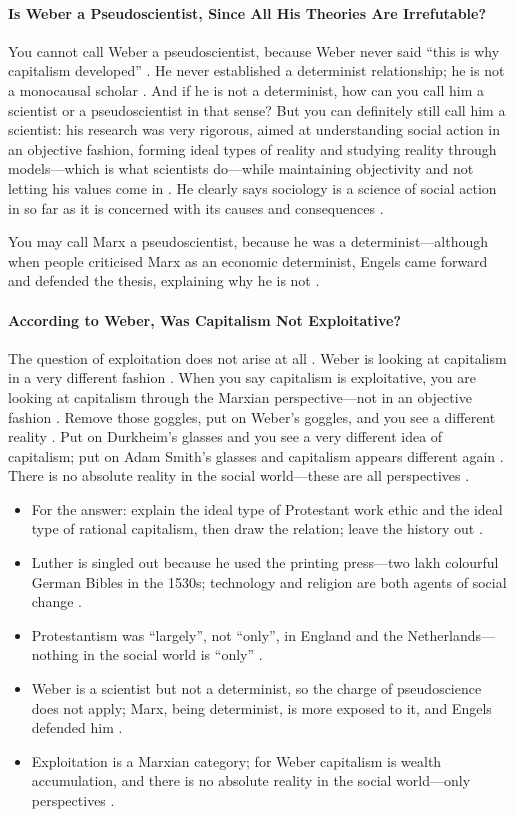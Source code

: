 \paragraph{Is Weber a Pseudoscientist, Since All His Theories Are Irrefutable?}
You cannot call Weber a pseudoscientist, because Weber never said ``this is why capitalism developed'' . He never established a determinist relationship; he is not a monocausal scholar . And if he is not a determinist, how can you call him a scientist or a pseudoscientist in that sense? 
But you can definitely still call him a scientist: his research was very rigorous, aimed at understanding social action in an objective fashion, forming ideal types of reality and studying reality through models---which is what scientists do---while maintaining objectivity and not letting his values come in .
He clearly says sociology is a science of social action in so far as it is concerned with its causes and consequences .

You may call Marx a pseudoscientist, because he was a determinist---although when people criticised Marx as an economic determinist, Engels came forward and defended the thesis, explaining why he is not .

\paragraph{According to Weber, Was Capitalism Not Exploitative?}
The question of exploitation does not arise at all . Weber is looking at capitalism in a very different fashion .
When you say capitalism is exploitative, you are looking at capitalism through the Marxian perspective---not in an objective fashion . Remove those goggles, put on Weber's goggles, and you see a different reality . Put on Durkheim's glasses and you see a very different idea of capitalism; put on Adam Smith's glasses and capitalism appears different again .
There is no absolute reality in the social world---these are all perspectives .

\begin{QuickRevision}
\begin{itemize}
    \item For the answer: explain the ideal type of Protestant work ethic and the ideal type of rational capitalism, then draw the relation; leave the history out .
    \item Luther is singled out because he used the printing press---two lakh colourful German Bibles in the 1530s; technology and religion are both agents of social change .
    \item Protestantism was ``largely'', not ``only'', in England and the Netherlands---nothing in the social world is ``only'' .
    \item Weber is a scientist but not a determinist, so the charge of pseudoscience does not apply; Marx, being determinist, is more exposed to it, and Engels defended him .
    \item Exploitation is a Marxian category; for Weber capitalism is wealth accumulation, and there is no absolute reality in the social world---only perspectives .
\end{itemize}
\end{QuickRevision}

